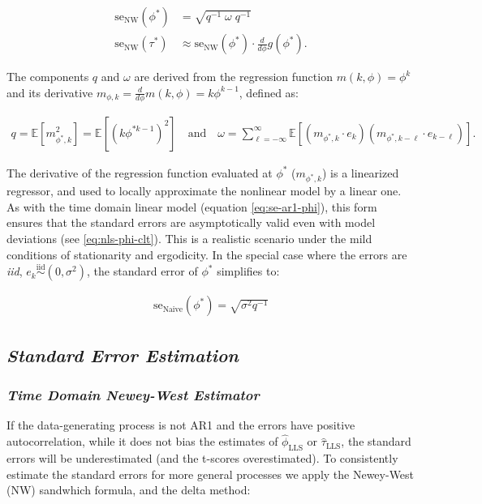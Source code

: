\documentclass[main.tex]{subfiles}
\begin{document}
\begin{align}
    \text{se}_\text{NW}(\phi^*) &= \sqrt{q^{-1}\; \omega \;q^{-1}}\\
    \text{se}_\text{NW}(\tau^*) &\approx \text{se}_\text{NW}(\phi^*) \cdot \frac{d}{d\phi}g(\phi^*).
\end{align}

\noindent The components $q$ and $\omega$ are derived from the regression function $m(k, \phi) = \phi^k$ and its derivative $m_{\phi, k} = \frac{d}{d\phi} m(k, \phi) = k \phi^{k-1}$, defined as:

\begin{align}
    q = \mathbb{E}[m_{\phi^*, k}^2] = \mathbb{E}[(k \phi^{*k-1})^2] \quad\text{and}\quad
    \omega = \sum_{\ell=-\infty}^{\infty} \mathbb{E}[(m_{\phi^*, k} \cdot e_{k})(m_{\phi^*, k-\ell} \cdot e_{k-\ell})].
\end{align}

The derivative of the regression function evaluated at $\phi^*$ ($m_{\phi^*, k}$) is a linearized regressor, and used to locally approximate the nonlinear model by a linear one. As with the time domain linear model (equation \eqref{eq:se-ar1-phi}), this form ensures that the standard errors are asymptotically valid even with model deviations (see \eqref{eq:nls-phi-clt}). This is a realistic scenario under the mild conditions of stationarity and ergodicity. In the special case where the errors are \textit{iid}, $e_k \overset{\text{iid}}{\sim} (0, \sigma^2)$, the standard error of $\phi^*$ simplifies to:

\begin{align}
    \text{se}_{\text{Naive}}(\phi^*) = \sqrt{\sigma^2 q^{-1}}
\end{align}

\subsection{\textit{Standard Error Estimation}}
\subsubsection{\normalfont\textit{Time Domain Newey-West Estimator}}

If the data-generating process is not AR1 and the errors have positive autocorrelation, while it does not bias the estimates of $\hat\phi_{\scriptscriptstyle\text{LLS}}$ or $\hat\tau_{\scriptscriptstyle\text{LLS}}$, the standard errors will be underestimated (and the t-scores overestimated). To consistently estimate the standard errors for more general processes we apply the Newey-West (NW) sandwhich formula, and the delta method:
\end{document}
